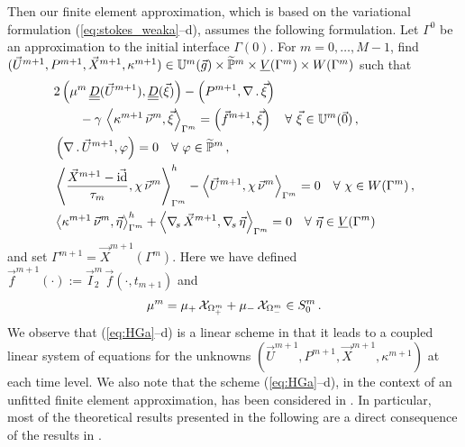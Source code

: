 \sloppy Then our finite element approximation, which is based on the variational
formulation (\ref{eq:stokes_weaka}--d), assumes the following formulation. Let
$\Gamma^0$ be an approximation to the initial interface $\Gamma(0)$. For
$m=0,\ldots, M-1$, find ${(\vec U^{m+1}, P^{m+1}, \vec X^{m+1}, \kappa^{m+1})
\in \mathbb{U}^{m}(\vec{g})\times \widetilde{\mathbb{P}}^m \times \underline{V}(\Gamma^m) \times W(\Gamma^m)}$ such that
\begin{subequations}
\begin{align}
& 2\left(\mu^m\,\mat D(\vec U^{m+1}), \mat D(\vec \xi) \right)
- \left(P^{m+1}, \nabla\,.\,\vec \xi\right) \nonumber \\
& \qquad - \gamma\,\left\langle
\kappa^{m+1}\,\vec\nu^m,\vec\xi\right\rangle_{\Gamma^m}
= \left(\vec f^{m+1},\vec \xi\right) \quad \forall\ \vec\xi \in
\uspacedisc{0}{m}\,, \label{eq:HGa}\\
& \left(\nabla\,.\,\vec U^{m+1}, \varphi\right)  = 0
\quad \forall\ \varphi \in \pnormspace^m\,,\label{eq:HGb} \\
&  \left\langle \frac{\vec X^{m+1} - \vec\id}{\tau_m} ,\chi\,\vec\nu^m
\right\rangle_{\Gamma^m}^h - \left\langle \vec U^{m+1}, \chi\,\vec\nu^m
\right\rangle_{\Gamma^m}  = 0 \quad \forall\ \chi \in \Wh\,, \label{eq:HGc} \\
& \left\langle \kappa^{m+1}\,\vec\nu^m, \vec\eta \right\rangle_{\Gamma^m}^h
+ \left\langle \nabs\,\vec X^{m+1}, \nabs\,\vec \eta \right\rangle_{\Gamma^m} =
0 \quad \forall\ \vec\eta \in \Vh \label{eq:HGd}
\end{align}
\end{subequations}
and set $\Gamma^{m+1} = \vec X^{m+1}(\Gamma^m)$. Here we have defined
$\vec f^{m+1}(\cdot) := \vec I^m_2\,\vec f(\cdot,t_{m+1})$ and
\begin{equation}
\mu^m =\mu_+\,\mathrm{\mathcal{X}}_{\Omega^m_+} + \mu_-\,\mathrm{\mathcal{X}}_{\Omega^m_-}\in S^m_0\,.
\end{equation}
We observe that (\ref{eq:HGa}--d) is a linear scheme in that it leads to a
coupled linear system of equations for the unknowns
$(\vec U^{m+1}, P^{m+1}, \vec X^{m+1}, \kappa^{m+1})$ at each time level.
We also note that the scheme (\ref{eq:HGa}--d), in the context of an
unfitted finite element approximation, has been considered in \cite{spurious}.
In particular, most of the theoretical results presented in the following
are a direct consequence of the results in \cite{spurious}.

